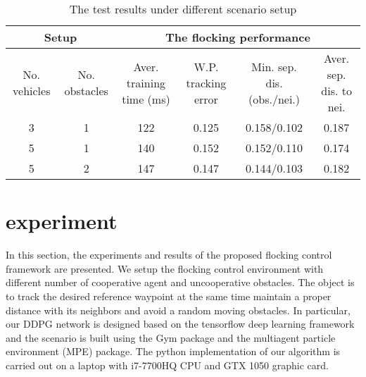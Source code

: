 \documentclass[letterpaper,10 pt,conference]{ieeeconf}
\begin{document}
\begin{table*}[tbh]
	\centering
	\caption{The test results under different scenario setup}
	\label{tab2}
	\begin{tabular}{|c|c|c|c|c|c|}
		\hline
		\multicolumn{2}{|c|}{Setup} & \multicolumn{4}{c|}{The flocking performance}                                                                                                                     \\ \hline
		No. vehicles & No. obstacles & Aver. training time (ms) & W.P. tracking error & Min. sep. dis. (obs./nei.) & Aver. sep. dis. to nei.\\ \hline
		3            & 1            & 122                             & 0.125                         & 0.158/0.102                                         & 0.187                                     \\ \hline
		5            & 1            & 140                             & 0.152                         & 0.152/0.110                                         & 0.174                                     \\ \hline
		5            & 2            & 147                             & 0.147                         & 0.144/0.103                                         & 0.182                                     \\ \hline
	\end{tabular}
\end{table*}
\section{experiment}
In this section, the experiments and results of the proposed flocking control framework are presented. We setup the flocking control environment with different number of cooperative agent  and uncooperative obstacles. The object is to track the desired reference waypoint at the same time maintain a proper distance with its neighbors and avoid a random moving obstacles.
In particular, our DDPG network is designed based on the tensorflow deep learning framework \cite{abadi2016tensorflow} and the scenario is built using the Gym package \cite{brockman2016openai} and the multiagent particle environment (MPE) package\cite{lowe2017multi}. The python implementation of our algorithm is carried out on a laptop with i7-7700HQ CPU and GTX 1050 graphic card.
\end{document}
